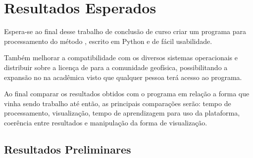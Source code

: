 \chapter{Resultados Esperados}
    \label{cap-resultados}
    Espera-se ao final desse trabalho de conclusão de curso criar um programa para processamento do método \MT, escrito em Python e de fácil usabilidade.
    
    Também melhorar a compatibilidade com os diversos sistemas operacionais e distribuir sobre a licença de  para a comunidade geofísica, possibilitando a expansão no \MT na acadêmica visto que qualquer pessoa terá acesso ao programa.
    
    Ao final comparar os resultados obtidos com o programa em relação a forma que vinha sendo trabalho até então, as principais comparações serão: tempo de processamento, visualização, tempo de aprendizagem para uso da plataforma, coerência entre resultados e manipulação da forma de visualização. 
    
    
    
\section{Resultados Preliminares}

    
